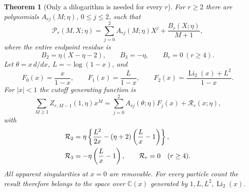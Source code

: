 \documentclass[11pt,a4paper]{article}
\newtheorem{theorem}{Theorem}[section]
\theoremstyle{definition}
\theoremstyle{remark}
\numberwithin{equation}{section}
\begin{document}
\begin{theorem}[Only a dilogarithm is needed for every $r$]
\label{hp:all-r-generator}
For $r\ge2$ there are polynomials $A_{rj}(M;\eta)$,
$0\le j\le2$, such that
\begin{equation}\label{hp:polynomial-plus-residue}
 \mathcal P_r(M,X;\eta)=\sum_{j=0}^2A_{rj}(M;\eta)X^j
                        +\frac{B_r(X;\eta)}{M+1},
\end{equation}
where the entire endpoint residue is
\begin{equation}\label{hp:residue}
 B_2=\eta(X-\eta-2),\qquad B_3=-\eta,\qquad B_r=0\ (r\ge4).
\end{equation}
Let $\theta=x\,d/dx$, $L=-\log(1-x)$, and
\[
 F_0(x)=\frac{x}{1-x},\qquad F_1(x)=\frac{L}{1-x},
 \qquad F_2(x)=\frac{\operatorname{Li}_2(x)+L^2}{1-x}.
\]
For $|x|<1$ the cutoff generating function is
\begin{equation}\label{hp:generator-general}
 \boxed{\displaystyle
 \sum_{M\ge1}Z_{r,M-1}(1,\eta)x^M
       =\sum_{j=0}^2A_{rj}(\theta;\eta)F_j(x)+\mathcal R_r(x;\eta),}
\end{equation}
with
\begin{align}
 \mathcal R_2&=\eta\left\{\frac{L^2}{2x}
                   -(\eta+2)\left(\frac Lx-1\right)\right\},\notag\\
 \mathcal R_3&=-\eta\left(\frac Lx-1\right),\qquad
 \mathcal R_r=0\quad(r\ge4).
 \label{hp:generator-residue}
\end{align}
All apparent singularities at $x=0$ are removable.
For every particle count the result therefore belongs to the
space over $\mathbb C(x)$ generated by
$1,L,L^2,\operatorname{Li}_2(x)$.
\end{theorem}
\end{document}

